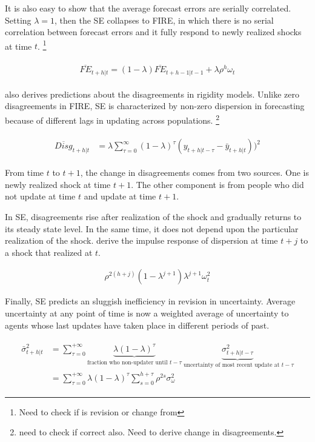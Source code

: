 \documentclass[]{article}
\begin{document}
It is also easy to show that the average forecast errors are serially correlated. Setting $\lambda=1$, then the SE collapses to FIRE, in which there is no serial correlation between forecast errors and it fully respond to newly realized shocks at time $t$.  \footnote{Need to check if is revision or change from}

\begin{eqnarray}
\begin{aligned}
\overline{FE}_{t+h|t}  = (1-\lambda) \overline {FE}_{t+h-1|t-1} + \lambda \rho^h \omega_t 
\end{aligned}
\end{eqnarray}


\citet{coibion2012can} also derives predictions about the disagreements in rigidity models. Unlike zero disagreements in FIRE, SE is characterized by non-zero dispersion in forecasting because of different lags in updating across populations. \footnote{need to check if correct also. Need to derive change in disagreements.} 

\begin{eqnarray}
\begin{aligned}
\overline{Disg}_{t+h|t} & = \lambda \sum^{\infty}_{\tau=0} (1-\lambda)^{\tau} (y_{t+h|t-\tau} - \bar y_{t+h|t }))^2  
\end{aligned}
\end{eqnarray}

From time $t$ to $t+1$, the change in disagreements comes from two sources. One is newly realized shock at time $t+1$. The other component is from people who did not update at time $t$ and update at time $t+1$.  

In SE, disagreements rise after realization of the shock and gradually returns to its steady state level. In the same time, it does not depend upon the particular realization of the shock. \citet{coibion2012can} derive the impulse response of dispersion at time $t+j$ to a shock that realized at $t$. 

\begin{eqnarray}
\rho^{2(h+j)} (1-\lambda^{j+1})\lambda^{j+1} \omega^2_t
\end{eqnarray}

Finally, SE predicts an sluggish inefficiency in revision in uncertainty. Average uncertainty at any point of time is now a weighted average of uncertainty to agents whose last updates have taken place in different periods of past.  

\begin{eqnarray}\label{VarSEPop}
\begin{aligned}
\bar \sigma^2_{t+h|t} & = \sum^{+\infty}_{\tau =0} \underbrace{\lambda (1-\lambda)^\tau}_{\text{fraction who non-updater until }t-\tau} \underbrace{\sigma^2_{t+h|t-\tau}}_{\text{ uncertainty of most recent update at }t-\tau} \\
& = \sum^{+\infty}_{\tau =0} \lambda (1-\lambda)^\tau \sum^{h+\tau}_{s=0}\rho^{2s} \sigma^2_{\omega}
\end{aligned}
\end{eqnarray}
\end{document}

